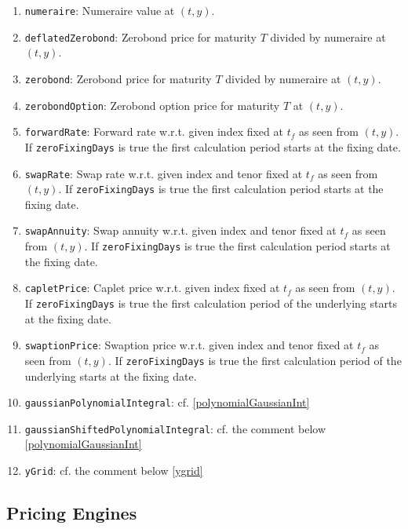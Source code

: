 \documentclass{amsart}
\theoremstyle{plain}
\numberwithin{equation}{section}
\begin{document}
\begin{enumerate}
\item \verb+numeraire+: Numeraire value at $(t,y)$. 
\item \verb+deflatedZerobond+: Zerobond price for maturity $T$ divided by numeraire at $(t,y)$.
\item \verb+zerobond+: Zerobond price for maturity $T$ divided by numeraire at $(t,y)$.
\item \verb+zerobondOption+: Zerobond option price for maturity $T$ at $(t,y)$.
\item \verb+forwardRate+: Forward rate w.r.t. given index fixed at $t_f$ as seen from $(t,y)$. If \verb+zeroFixingDays+ is true the first calculation period starts at the fixing date.
\item \verb+swapRate+: Swap rate w.r.t. given index and tenor fixed at $t_f$ as seen from $(t,y)$. If \verb+zeroFixingDays+ is true the first calculation period starts at the fixing date.
\item \verb+swapAnnuity+: Swap annuity w.r.t. given index and tenor fixed at $t_f$ as seen from $(t,y)$. If \verb+zeroFixingDays+ is true the first calculation period starts at the fixing date.
\item \verb+capletPrice+: Caplet price w.r.t. given index fixed at $t_f$ as seen from $(t,y)$. If \verb+zeroFixingDays+ is true the first calculation period of the underlying starts at the fixing date.
\item \verb+swaptionPrice+: Swaption price w.r.t. given index and tenor fixed at $t_f$ as seen from $(t,y)$. If \verb+zeroFixingDays+ is true the first calculation period of the underlying starts at the fixing date.
\item \verb+gaussianPolynomialIntegral+: cf. \ref{polynomialGaussianInt}
\item \verb+gaussianShiftedPolynomialIntegral+: cf. the comment below \ref{polynomialGaussianInt}
\item \verb+yGrid+: cf. the comment below \ref{ygrid}
\end{enumerate}




\subsection{Pricing Engines}
\end{document}
